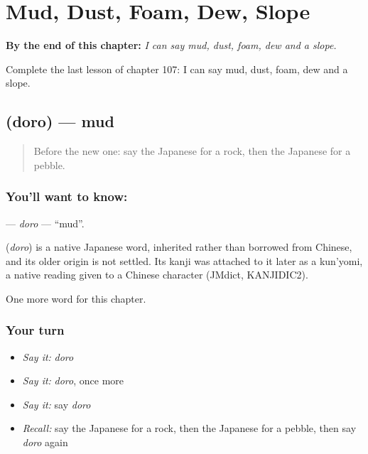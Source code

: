 
\chapter{Mud, Dust, Foam, Dew, Slope}
\label{ch:ja-mud-dust-foam-dew-slope}

\begin{chapteropening}
\textbf{By the end of this chapter:} \emph{I can say mud, dust, foam, dew and a slope.}

Complete the last lesson of chapter 107: I can say mud, dust, foam, dew and a slope.
\end{chapteropening}

\section[\texorpdfstring{\ja{どろ} (doro)}{どろ (doro)}]{ (doro) — mud}

\label{lesson:JA-C107-doro}



\begin{quote}
Before the new one: say the Japanese for a rock, then the Japanese for a pebble.
\end{quote}

\subsection*{You'll want to know: }
\textbf{} — \emph{doro} — \textquotedblleft{}mud\textquotedblright{}.

\begin{cousinweb}
\textbf{} (\emph{doro}) is a native Japanese word, inherited rather than borrowed from Chinese, and its older origin is not settled. Its kanji was attached to it later as a kun'yomi, a native reading given to a Chinese character (JMdict, KANJIDIC2).
\end{cousinweb}

\begin{grammarlens}[title={What you've built}]
One more word for this chapter.
\end{grammarlens}

\subsection*{Your turn}
\begin{itemize}
\raggedright
  \item \emph{Say it:} \emph{doro}
  \item \emph{Say it:} \emph{doro}, once more
  \item \emph{Say it:} say \emph{doro}
  \item \emph{Recall:} say the Japanese for a rock, then the Japanese for a pebble, then say \emph{doro} again
\end{itemize}

